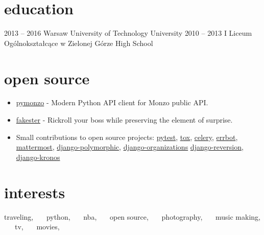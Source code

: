 \documentclass[]{cv-style}          %
\begin{document}
\vspace{-0.2cm}


\section{education}
  \vspace{-0.2cm}

\begin{entrylist}
\entry
  {2013 -- 2016}
  {Warsaw University of Technology}
  {University}
  {}
\entry
  {2010 -- 2013}
  {I Liceum Ogólnokształcące w Zielonej Górze}
  {High School}
  {}
\end{entrylist}

\vspace{-0.4cm}


\section{open source}
  \vspace{-0.2cm}

\begin{itemize}
  \item \href{https://github.com/pawelad/pymonzo}{pymonzo} - Modern Python API client for Monzo public API.
  \item \href{https://github.com/pawelad/fakester}{fakester} - Rickroll your boss while preserving the element of surprise.
  \item Small contributions to open source projects: \href{https://github.com/pytest-dev/pytest}{pytest}, \href{https://github.com/tox-dev/tox}{tox}, \href{https://github.com/celery/celery}{celery}, \href{https://github.com/errbotio/errbot}{errbot}, \href{https://github.com/mattermost/mattermost}{mattermost}, \href{https://github.com/jazzband/django-polymorphic}{django-polymorphic}, \href{https://github.com/bennylope/django-organizations}{django-organizations} \href{https://github.com/etianen/django-reversion}{django-reversion}, \href{https://github.com/jgorset/django-kronos}{django-kronos}
\end{itemize}


\section{interests}
  \vspace{-0.2cm}

traveling, \ \ \ python, \ \ \ nba, \ \ \ open source, \ \ \ photography, \ \ \ music making, \ \ \ tv, \ \ \ movies, \ \ \
\end{document}
